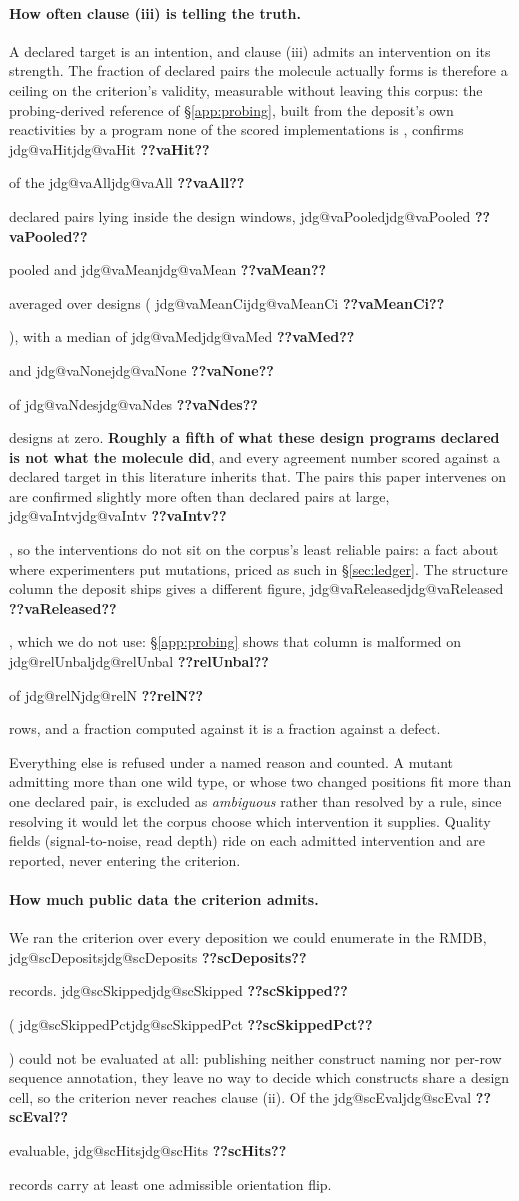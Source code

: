 \documentclass[11pt]{article}
\makeatletter
\newcommand{\jdg}[1]{%
  \ifcsname jdg@#1\endcsname\csname jdg@#1\endcsname
  \else\textbf{??#1??}\PackageError{nm}{undefined measured quantity #1}{}\fi}
\makeatother
\begin{document}
\paragraph{How often clause (iii) is telling the truth.}\label{sec:clauseiii} A declared target is an intention, and
clause (iii) admits an intervention on its strength. The fraction of declared pairs the molecule actually forms is therefore a ceiling on the
criterion's validity, measurable without leaving this corpus: the probing-derived reference of
\S\ref{app:probing}, built from the deposit's own reactivities by a program none of the scored
implementations is \citep{deigan2009accurate}, confirms \jdg{vaHit} of the \jdg{vaAll} declared pairs lying inside
the design windows, \jdg{vaPooled} pooled and \jdg{vaMean} averaged over designs
(\jdg{vaMeanCi}), with a median of \jdg{vaMed} and \jdg{vaNone} of \jdg{vaNdes} designs at zero.
\textbf{Roughly a fifth of what these design programs declared is not what the molecule did}, and
every agreement number scored against a declared target in this literature inherits that.
The pairs this paper intervenes on are confirmed slightly more often than declared pairs at large,
\jdg{vaIntv}, so the interventions do not sit on the corpus's least reliable pairs: a fact about
where experimenters put mutations, priced as such in \S\ref{sec:ledger}. The structure column the
deposit ships gives a different figure, \jdg{vaReleased}, which we do not use:
\S\ref{app:probing} shows that column is malformed on \jdg{relUnbal} of \jdg{relN} rows, and a
fraction computed against it is a fraction against a defect.

Everything else is refused under a named reason and counted. A mutant admitting more than one wild
type, or whose two changed positions fit more than one declared pair, is excluded as
\emph{ambiguous} rather than resolved by a rule, since resolving it would let the corpus choose
which intervention it supplies. Quality fields (signal-to-noise, read depth) ride on each admitted
intervention and are reported, never entering the criterion.

\paragraph{How much public data the criterion admits.} We ran the criterion over every deposition
we could enumerate in the RMDB, \jdg{scDeposits} records. \jdg{scSkipped} (\jdg{scSkippedPct})
could not be evaluated at all: publishing neither construct naming nor per-row sequence
annotation, they leave no way to decide which constructs share a design cell, so the criterion
never reaches clause (ii). Of the \jdg{scEval} evaluable, \jdg{scHits} records carry at least one
admissible orientation flip.
\end{document}
